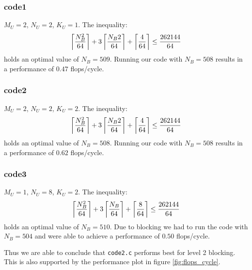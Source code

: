 \documentclass[portrait,a4paper]{article}
\begin{document}
\subsubsection{code1}
$M_U=2$, $N_U=2$, $K_U=1$. The inequality:
\begin{align*}
    \left\lceil {N_B^2 \over 64} \right\rceil + 3\left\lceil {N_B 2 \over 64} \right\rceil
    + \left\lceil {4 \over 64} \right\rceil \leq {262144 \over 64}
\end{align*}
holds an optimal value of $N_B=509$.  Running our code with $N_B= 508$ results in a performance of $0.47$ flops/cycle.
\subsubsection{code2}
$M_U=2$, $N_U=2$, $K_U=2$. The inequality:
\begin{align*}
    \left\lceil {N_B^2 \over 64} \right\rceil + 3\left\lceil {N_B 2 \over 64} \right\rceil
    + \left\lceil {4\over 64} \right\rceil \leq {262144 \over 64}
\end{align*}
holds an optimal value of $N_B=508$. Running our code with $N_B=508$ results in a performance of $0.62$ flops/cycle.

\subsubsection{code3}
$M_U=1$, $N_U=8$, $K_U=2$. The inequality:
\begin{align*}
    \left\lceil {N_B^2 \over 64} \right\rceil + 3\left\lceil {N_B \over 64} \right\rceil
    + \left\lceil {8 \over 64} \right\rceil \leq {262144 \over 64}
\end{align*}
holds an optimal value of $N_B=510$. Due to blocking we had to run the code with $N_B=504$ and were able to achieve a performance of $0.50$ flops/cycle.

Thus we are able to conclude that \lstinline{code2.c} performs best for level 2 blocking. This is also supported by the performance plot in figure \ref{fig:flops_cycle}.
\end{document}

